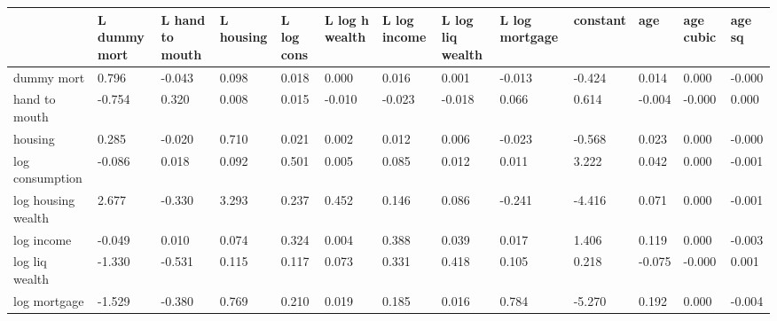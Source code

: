 \begin{table}[htbp]
\begin{tabular}{lllllllllllll} \hline \hline
 & L dummy mort  & L hand to mouth  & L housing  & L log cons  & L log h wealth  & L log income  & L log liq wealth  & L log mortgage  & constant  & age  & age cubic  & age sq  \\  \hline 
dummy mort &     0.796 &    -0.043 &     0.098 &     0.018 &     0.000 &     0.016 &     0.001 &    -0.013 &    -0.424 &     0.014 &     0.000 &    -0.000 \\  
hand to mouth &    -0.754 &     0.320 &     0.008 &     0.015 &    -0.010 &    -0.023 &    -0.018 &     0.066 &     0.614 &    -0.004 &    -0.000 &     0.000 \\  
housing &     0.285 &    -0.020 &     0.710 &     0.021 &     0.002 &     0.012 &     0.006 &    -0.023 &    -0.568 &     0.023 &     0.000 &    -0.000 \\  
log consumption &    -0.086 &     0.018 &     0.092 &     0.501 &     0.005 &     0.085 &     0.012 &     0.011 &     3.222 &     0.042 &     0.000 &    -0.001 \\  
log housing wealth &     2.677 &    -0.330 &     3.293 &     0.237 &     0.452 &     0.146 &     0.086 &    -0.241 &    -4.416 &     0.071 &     0.000 &    -0.001 \\  
log income &    -0.049 &     0.010 &     0.074 &     0.324 &     0.004 &     0.388 &     0.039 &     0.017 &     1.406 &     0.119 &     0.000 &    -0.003 \\  
log liq wealth &    -1.330 &    -0.531 &     0.115 &     0.117 &     0.073 &     0.331 &     0.418 &     0.105 &     0.218 &    -0.075 &    -0.000 &     0.001 \\  
log mortgage &    -1.529 &    -0.380 &     0.769 &     0.210 &     0.019 &     0.185 &     0.016 &     0.784 &    -5.270 &     0.192 &     0.000 &    -0.004 \\  
\hline \hline \end{tabular}
\end{table}
